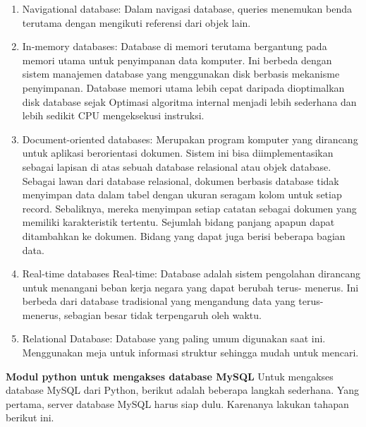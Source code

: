 \begin{enumerate}
\item Navigational database: Dalam navigasi database, queries menemukan benda terutama dengan mengikuti referensi dari objek lain. \par
 
\item In-memory databases: Database di memori terutama bergantung pada memori utama untuk penyimpanan data komputer. Ini berbeda dengan sistem manajemen database yang menggunakan disk berbasis mekanisme penyimpanan. Database memori utama lebih cepat daripada dioptimalkan disk database sejak Optimasi algoritma internal menjadi lebih sederhana dan lebih sedikit CPU mengeksekusi instruksi. \par
 
\item Document-oriented databases: Merupakan program komputer yang dirancang untuk aplikasi berorientasi dokumen. Sistem ini bisa diimplementasikan sebagai lapisan di atas sebuah database relasional atau objek database. Sebagai lawan dari database relasional, dokumen berbasis database tidak menyimpan data dalam tabel dengan ukuran seragam kolom untuk setiap record. Sebaliknya, mereka menyimpan setiap catatan sebagai dokumen yang memiliki karakteristik tertentu. Sejumlah bidang panjang apapun dapat ditambahkan ke dokumen. Bidang yang dapat juga berisi beberapa bagian data. 
 
\item Real-time databases Real-time: Database adalah sistem pengolahan dirancang untuk menangani beban kerja negara yang dapat berubah terus- menerus. Ini berbeda dari database tradisional yang mengandung data yang terus- menerus, sebagian besar tidak terpengaruh oleh waktu. 
 
\item Relational Database: Database yang paling umum digunakan saat ini. Menggunakan meja untuk informasi struktur sehingga mudah untuk mencari.\end{enumerate}
 
\vspace{12pt}
 
\textbf{Modul python}\textbf{ untuk mengakses database MySQL} 
Untuk mengakses database MySQL dari Python, berikut adalah beberapa langkah sederhana. Yang pertama, server database MySQL harus siap dulu. Karenanya lakukan tahapan berikut ini. 


